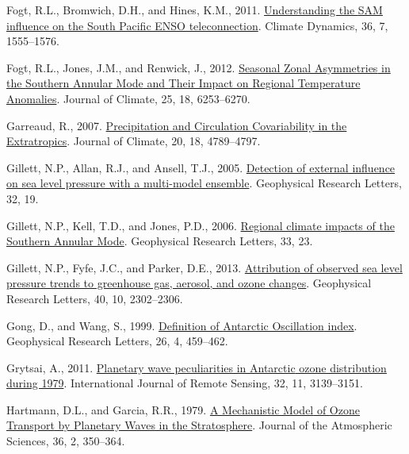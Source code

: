\documentclass[12pt,oneside]{reedthesis}
\newlength{\cslhangindent}
\newenvironment{CSLReferences}[2] %
 {%
  \setlength{\parindent}{0pt}
  \ifodd #1 \everypar{\setlength{\hangindent}{\cslhangindent}}\ignorespaces\fi
  \ifnum #2 > 0
  \setlength{\parskip}{#2\baselineskip}
  \fi
 }%
 {}
\begin{document}
\begin{CSLReferences}{1}{0}
\leavevmode{}%
Fogt, R.L., Bromwich, D.H., and Hines, K.M., 2011. \href{https://doi.org/10.1007/s00382-010-0905-0}{Understanding the {SAM} influence on the {South Pacific ENSO} teleconnection}. Climate Dynamics, 36, 7, 1555--1576.

\leavevmode{}%
Fogt, R.L., Jones, J.M., and Renwick, J., 2012. \href{https://doi.org/10.1175/JCLI-D-11-00474.1}{Seasonal {Zonal Asymmetries} in the {Southern Annular Mode} and {Their Impact} on {Regional Temperature Anomalies}}. Journal of Climate, 25, 18, 6253--6270.

\leavevmode{}%
Garreaud, R., 2007. \href{https://doi.org/10.1175/JCLI4257.1}{Precipitation and {Circulation Covariability} in the {Extratropics}}. Journal of Climate, 20, 18, 4789--4797.

\leavevmode{}%
Gillett, N.P., Allan, R.J., and Ansell, T.J., 2005. \href{https://doi.org/10.1029/2005GL023640}{Detection of external influence on sea level pressure with a multi-model ensemble}. Geophysical Research Letters, 32, 19.

\leavevmode{}%
Gillett, N.P., Kell, T.D., and Jones, P.D., 2006. \href{https://doi.org/10.1029/2006GL027721}{Regional climate impacts of the {Southern Annular Mode}}. Geophysical Research Letters, 33, 23.

\leavevmode{}%
Gillett, N.P., Fyfe, J.C., and Parker, D.E., 2013. \href{https://doi.org/10.1002/grl.50500}{Attribution of observed sea level pressure trends to greenhouse gas, aerosol, and ozone changes}. Geophysical Research Letters, 40, 10, 2302--2306.

\leavevmode{}%
Gong, D., and Wang, S., 1999. \href{https://doi.org/10.1029/1999GL900003}{Definition of {Antarctic Oscillation} index}. Geophysical Research Letters, 26, 4, 459--462.

\leavevmode{}%
Grytsai, A., 2011. \href{https://doi.org/10.1080/01431161.2010.541518}{Planetary wave peculiarities in {Antarctic} ozone distribution during 1979}. International Journal of Remote Sensing, 32, 11, 3139--3151.

\leavevmode{}%
Hartmann, D.L., and Garcia, R.R., 1979. \href{https://doi.org/10.1175/1520-0469(1979)036\%3C0350:AMMOOT\%3E2.0.CO;2}{A {Mechanistic Model} of {Ozone Transport} by {Planetary Waves} in the {Stratosphere}}. Journal of the Atmospheric Sciences, 36, 2, 350--364.


\end{CSLReferences}
\end{document}
